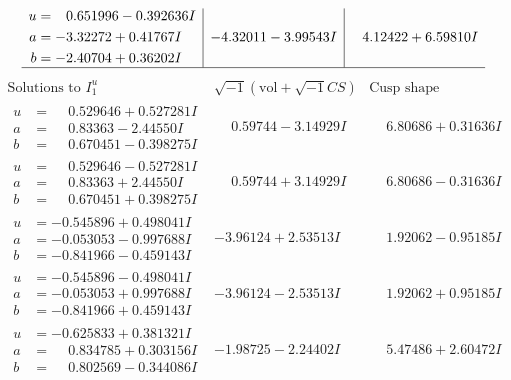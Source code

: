 \documentclass[1p]{elsarticle_modified}
\theoremstyle{definition}
\newcommand{\I}{\sqrt{-1}}
\begin{document}
$$\begin{array}{c|c|c}
\begin{aligned}
u &= \phantom{-}0.651996 - 0.392636 I \\
a &= -3.32272 + 0.41767 I \\
b &= -2.40704 + 0.36202 I\end{aligned}
 & -4.32011 - 3.99543 I & \phantom{-}4.12422 + 6.59810 I\\
 \hline 
 \end{array}$$\newpage$$\begin{array}{c|c|c}  
\text{Solutions to }I^u_{1}& \I (\text{vol} + \sqrt{-1}CS) & \text{Cusp shape}\\
 \hline 
\begin{aligned}
u &= \phantom{-}0.529646 + 0.527281 I \\
a &= \phantom{-}0.83363 - 2.44550 I \\
b &= \phantom{-}0.670451 - 0.398275 I\end{aligned}
 & \phantom{-}0.59744 - 3.14929 I & \phantom{-}6.80686 + 0.31636 I \\ \hline\begin{aligned}
u &= \phantom{-}0.529646 - 0.527281 I \\
a &= \phantom{-}0.83363 + 2.44550 I \\
b &= \phantom{-}0.670451 + 0.398275 I\end{aligned}
 & \phantom{-}0.59744 + 3.14929 I & \phantom{-}6.80686 - 0.31636 I \\ \hline\begin{aligned}
u &= -0.545896 + 0.498041 I \\
a &= -0.053053 - 0.997688 I \\
b &= -0.841966 - 0.459143 I\end{aligned}
 & -3.96124 + 2.53513 I & \phantom{-}1.92062 - 0.95185 I \\ \hline\begin{aligned}
u &= -0.545896 - 0.498041 I \\
a &= -0.053053 + 0.997688 I \\
b &= -0.841966 + 0.459143 I\end{aligned}
 & -3.96124 - 2.53513 I & \phantom{-}1.92062 + 0.95185 I \\ \hline\begin{aligned}
u &= -0.625833 + 0.381321 I \\
a &= \phantom{-}0.834785 + 0.303156 I \\
b &= \phantom{-}0.802569 - 0.344086 I\end{aligned}
 & -1.98725 - 2.24402 I & \phantom{-}5.47486 + 2.60472 I \\ \hline\begin{aligned}

\end{aligned}
\end{array}$$
\end{document}
